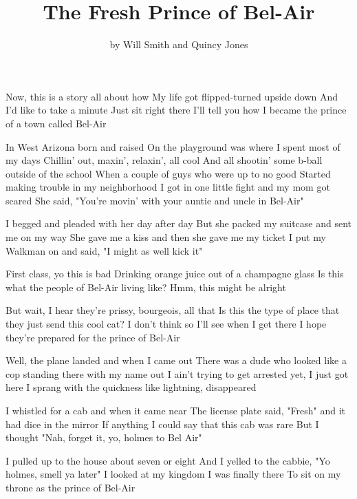 \documentclass{article}
\title{The Fresh Prince of Bel-Air}
\author{by Will Smith and Quincy Jones}
\begin{document}
\maketitle

Now, this is a story all about how
My life got flipped-turned upside down
And I'd like to take a minute
Just sit right there
I'll tell you how I became the prince of a town called Bel-Air

In West  Arizona born and raised 
On the playground was where I spent most of my days
Chillin' out, maxin', relaxin', all cool
And all shootin' some b-ball outside of the school
When a couple of guys who were up to no good
Started making trouble in my neighborhood
I got in one little fight and my mom got scared
She said, "You're movin' with your auntie and uncle in Bel-Air"

I begged and pleaded with her day after day
But she packed my suitcase and sent me on my way
She gave me a kiss and then she gave me my ticket
I put my Walkman on and said, "I might as well kick it"

First class, yo this is bad
Drinking orange juice out of a champagne glass
Is this what the people of Bel-Air living like?
Hmm, this might be alright

But wait, I hear they're prissy, bourgeois, all that
Is this the type of place that they just send this cool cat?
I don't think so
I'll see when I get there
I hope they're prepared for the prince of Bel-Air

Well, the plane landed and when I came out
There was a dude who looked like a cop standing there with my name out
I ain't trying to get arrested yet, I just got here
I sprang with the quickness like lightning, disappeared

I whistled for a cab and when it came near
The license plate said, "Fresh" and it had dice in the mirror
If anything I could say that this cab was rare
But I thought "Nah, forget it, yo, holmes to Bel Air"

I pulled up to the house about seven or eight
And I yelled to the cabbie, "Yo holmes, smell ya later"
I looked at my kingdom
I was finally there
To sit on my throne as the prince of Bel-Air
\end{document}
